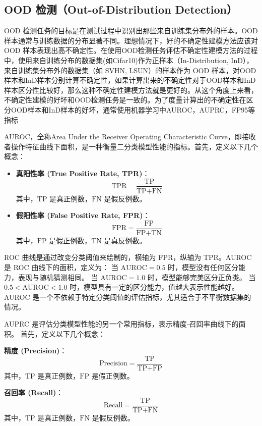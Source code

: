 \subsection{OOD 检测（Out-of-Distribution Detection）}

OOD 检测任务的目标是在测试过程中识别出那些来自训练集分布外的样本。OOD 样本通常与训练数据的分布显著不同。理想情况下，好的不确定性建模方法应该对 OOD 样本表现出高不确定性。在使用OOD检测任务评估不确定性建模方法的过程中，使用来自训练分布的数据集(如Cifar10)作为正样本（In-Distribution, InD），来自训练集分布外的数据集（如 SVHN, LSUN）的样本作为 OOD 样本，对OOD样本和InD样本分别计算不确定性，如果计算出来的不确定性对于OOD样本和InD样本区分性比较好，那么这种不确定性建模方法就是更好的。从这个角度上来看，不确定性建模的好坏和OOD检测任务是一致的。为了度量计算出的不确定性在区分OOD样本和InD样本的好坏，通常使用机器学习中AUROC，AUPRC，FP95等指标

AUROC，全称Area Under the Receiver Operating Characteristic Curve，即接收者操作特征曲线下面积，是一种衡量二分类模型性能的指标。首先，定义以下几个概念：
\begin{itemize}
    \item \textbf{真阳性率 (True Positive Rate, TPR)}：
    \[
    \text{TPR} = \frac{\text{TP}}{\text{TP} + \text{FN}}
    \]
    其中，\(\text{TP}\) 是真正例数，\(\text{FN}\) 是假反例数。
    
    \item \textbf{假阳性率 (False Positive Rate, FPR)}：
    \[
    \text{FPR} = \frac{\text{FP}}{\text{FP} + \text{TN}}
    \]
    其中，\(\text{FP}\) 是假正例数，\(\text{TN}\) 是真反例数。
\end{itemize}

ROC 曲线是通过改变分类阈值来绘制的，横轴为 FPR，纵轴为 TPR。AUROC 是 ROC 曲线下的面积，定义为：
当 \(\text{AUROC} = 0.5\) 时，模型没有任何区分能力，表现与随机猜测相同。
当 \(\text{AUROC} = 1.0\) 时，模型能够完美区分正负类。
当 \(0.5 < \text{AUROC} < 1.0\) 时，模型具有一定的区分能力，值越大表示性能越好。AUROC 是一个不依赖于特定分类阈值的评估指标，尤其适合于不平衡数据集的情况。

AUPRC 是评估分类模型性能的另一个常用指标，表示精度-召回率曲线下的面积。
首先，定义以下几个概念：

\textbf{精度 (Precision)}：
    \[
    \text{Precision} = \frac{\text{TP}}{\text{TP} + \text{FP}}
    \]
    其中，\(\text{TP}\) 是真正例数，\(\text{FP}\) 是假正例数。
    
\textbf{召回率 (Recall)}：
    \[
    \text{Recall} = \frac{\text{TP}}{\text{TP} + \text{FN}}
    \]
    其中，\(\text{TP}\) 是真正例数，\(\text{FN}\) 是假反例数。


